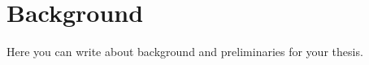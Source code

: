\section{Background}
\label{sec:kappa:preliminaries}

Here you can write about background and preliminaries for your thesis.